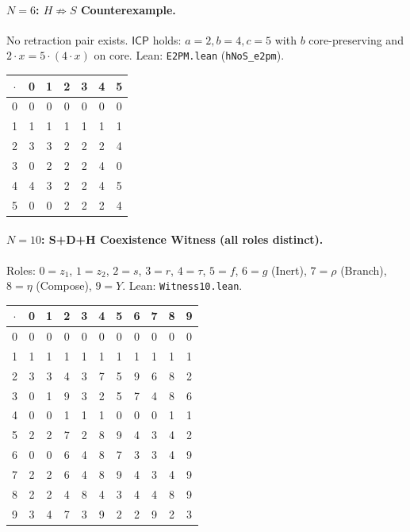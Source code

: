 \documentclass[sigconf,screen,review,anonymous]{acmart}
\newcommand{\dotop}{\cdot}
\newcommand{\ICP}{\textsf{ICP}}
\begin{document}
\paragraph{$N\!=\!6$: $H \not\Rightarrow S$ Counterexample.}
No retraction pair exists. $\ICP$ holds: $a\!=\!2, b\!=\!4, c\!=\!5$ with $b$ core-preserving and $2 \dotop x = 5 \dotop (4 \dotop x)$ on core. \quad Lean: \texttt{E2PM.lean} (\texttt{hNoS\_e2pm}).

\medskip
{\small
\begin{tabular}{c|cccccc}
$\dotop$ & 0 & 1 & 2 & 3 & 4 & 5 \\\hline
0 & 0 & 0 & 0 & 0 & 0 & 0 \\
1 & 1 & 1 & 1 & 1 & 1 & 1 \\
2 & 3 & 3 & 2 & 2 & 2 & 4 \\
3 & 0 & 2 & 2 & 2 & 4 & 0 \\
4 & 4 & 3 & 2 & 2 & 4 & 5 \\
5 & 0 & 0 & 2 & 2 & 2 & 4 \\
\end{tabular}}

\paragraph{$N\!=\!10$: S+D+H Coexistence Witness (all roles distinct).}
Roles: $0 = z_1$, $1 = z_2$, $2 = s$, $3 = r$, $4 = \tau$, $5 = f$, $6 = g$ (Inert), $7 = \rho$ (Branch), $8 = \eta$ (Compose), $9 = Y$. \quad Lean: \texttt{Witness10.lean}.

\medskip
{\footnotesize
\begin{tabular}{c|cccccccccc}
$\dotop$ & 0 & 1 & 2 & 3 & 4 & 5 & 6 & 7 & 8 & 9 \\\hline
0 & 0 & 0 & 0 & 0 & 0 & 0 & 0 & 0 & 0 & 0 \\
1 & 1 & 1 & 1 & 1 & 1 & 1 & 1 & 1 & 1 & 1 \\
2 & 3 & 3 & 4 & 3 & 7 & 5 & 9 & 6 & 8 & 2 \\
3 & 0 & 1 & 9 & 3 & 2 & 5 & 7 & 4 & 8 & 6 \\
4 & 0 & 0 & 1 & 1 & 1 & 0 & 0 & 0 & 1 & 1 \\
5 & 2 & 2 & 7 & 2 & 8 & 9 & 4 & 3 & 4 & 2 \\
6 & 0 & 0 & 6 & 4 & 8 & 7 & 3 & 3 & 4 & 9 \\
7 & 2 & 2 & 6 & 4 & 8 & 9 & 4 & 3 & 4 & 9 \\
8 & 2 & 2 & 4 & 8 & 4 & 3 & 4 & 4 & 8 & 9 \\
9 & 3 & 4 & 7 & 3 & 9 & 2 & 2 & 9 & 2 & 3 \\
\end{tabular}}
\end{document}
